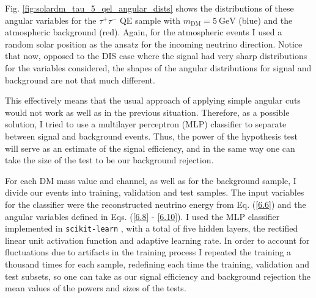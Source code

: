 Fig. \ref{fig:solardm_tau_5_qel_angular_dists} shows the distributions of these angular variables for the $\tau^{+}\tau^{-}$ QE sample with $m_{\mathrm{DM}} = 5 \ \mathrm{GeV}$ (blue) and the atmospheric background (red). Again, for the atmospheric events I used a random solar position as the ansatz for the incoming neutrino direction. Notice that now, opposed to the DIS case where the signal had very sharp distributions for the variables considered, the shapes of the angular distributions for signal and background are not that much different.

This effectively means that the usual approach of applying simple angular cuts would not work as well as in the previous situation. Therefore, as a possible solution, I tried to use a multilayer perceptron (MLP) classifier to separate between signal and background events. Thus, the power of the hypothesis test will serve as an estimate of the signal efficiency, and in the same way one can take the size of the test to be our background rejection.

For each DM mass value and channel, as well as for the background sample, I divide our events into training, validation and test samples. The input variables for the classifier were the reconstructed neutrino energy from Eq. (\ref{6.6}) and the angular variables defined in Eqs. (\ref{6.8} - \ref{6.10}). I used the MLP classifier implemented in \texttt{scikit-learn} \cite{scikit-learn}, with a total of five hidden layers, the rectified linear unit activation function and adaptive learning rate. In order to account for fluctuations due to artifacts in the training process I repeated the training a thousand times for each sample, redefining each time the training, validation and test subsets, so one can take as our signal efficiency and background rejection the mean values of the powers and sizes of the tests.


